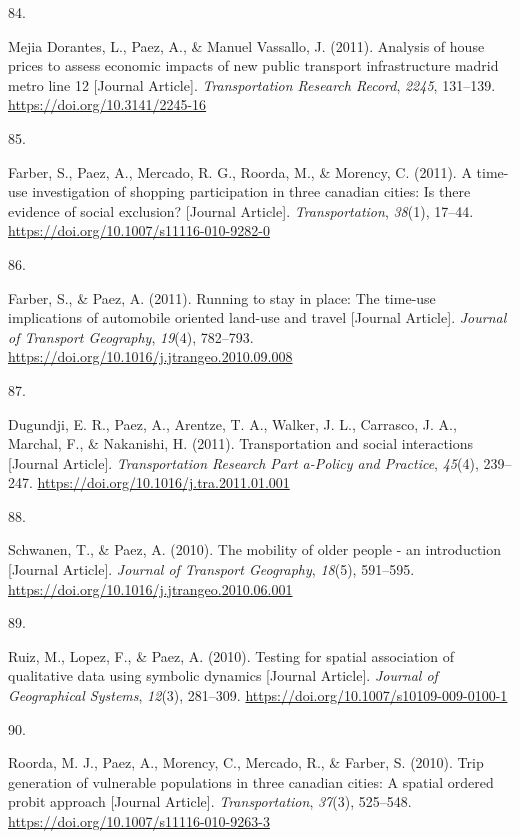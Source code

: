 \documentclass[11pt,a4paper,]{awesome-cv}
\newlength{\csllabelwidth}
\newcommand{\CSLLeftMargin}[1]{\parbox[t]{\csllabelwidth}{#1}}
\newcommand{\CSLRightInline}[1]{\parbox[t]{\linewidth - \csllabelwidth}{#1}}
\begin{document}
\leavevmode{}%
\CSLLeftMargin{84. }
\CSLRightInline{Mejia Dorantes, L., Paez, A., \& Manuel Vassallo, J.
(2011). Analysis of house prices to assess economic impacts of new
public transport infrastructure madrid metro line 12 {[}Journal
Article{]}. \emph{Transportation Research Record}, \emph{2245},
131--139. \url{https://doi.org/10.3141/2245-16}}

\leavevmode{}%
\CSLLeftMargin{85. }
\CSLRightInline{Farber, S., Paez, A., Mercado, R. G., Roorda, M., \&
Morency, C. (2011). A time-use investigation of shopping participation
in three canadian cities: Is there evidence of social exclusion?
{[}Journal Article{]}. \emph{Transportation}, \emph{38}(1), 17--44.
\url{https://doi.org/10.1007/s11116-010-9282-0}}

\leavevmode{}%
\CSLLeftMargin{86. }
\CSLRightInline{Farber, S., \& Paez, A. (2011). Running to stay in
place: The time-use implications of automobile oriented land-use and
travel {[}Journal Article{]}. \emph{Journal of Transport Geography},
\emph{19}(4), 782--793.
\url{https://doi.org/10.1016/j.jtrangeo.2010.09.008}}

\leavevmode{}%
\CSLLeftMargin{87. }
\CSLRightInline{Dugundji, E. R., Paez, A., Arentze, T. A., Walker, J.
L., Carrasco, J. A., Marchal, F., \& Nakanishi, H. (2011).
Transportation and social interactions {[}Journal Article{]}.
\emph{Transportation Research Part a-Policy and Practice}, \emph{45}(4),
239--247. \url{https://doi.org/10.1016/j.tra.2011.01.001}}

\leavevmode{}%
\CSLLeftMargin{88. }
\CSLRightInline{Schwanen, T., \& Paez, A. (2010). The mobility of older
people - an introduction {[}Journal Article{]}. \emph{Journal of
Transport Geography}, \emph{18}(5), 591--595.
\url{https://doi.org/10.1016/j.jtrangeo.2010.06.001}}

\leavevmode{}%
\CSLLeftMargin{89. }
\CSLRightInline{Ruiz, M., Lopez, F., \& Paez, A. (2010). Testing for
spatial association of qualitative data using symbolic dynamics
{[}Journal Article{]}. \emph{Journal of Geographical Systems},
\emph{12}(3), 281--309. \url{https://doi.org/10.1007/s10109-009-0100-1}}

\leavevmode{}%
\CSLLeftMargin{90. }
\CSLRightInline{Roorda, M. J., Paez, A., Morency, C., Mercado, R., \&
Farber, S. (2010). Trip generation of vulnerable populations in three
canadian cities: A spatial ordered probit approach {[}Journal
Article{]}. \emph{Transportation}, \emph{37}(3), 525--548.
\url{https://doi.org/10.1007/s11116-010-9263-3}}
\end{document}
